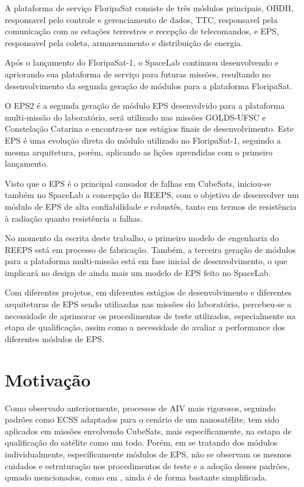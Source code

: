 A plataforma de serviço FloripaSat consiste de três módulos principais, \gls{OBDH}, responsavel pelo controle e gerenciamento de dados, \gls{TTC}, responsavel pela comunicação com as estações terrestres e recepção de telecomandos, e \gls{EPS}, responsavel pela coleta, armazenamento e distribuição de energia.

Após o lançamento do FloripaSat-1, o SpaceLab continuou desenvolvendo e apriorando sua plataforma de serviço para futuras missões, resultando no desenvolvimento da segunda geração de módulos para a plataforma FloripaSat.

O \gls{EPS2} é a segunda geração de módulo \gls{EPS} desenvolvido para a plataforma multi-missão do laboratório, será utilizado nas missões GOLDS-UFSC e Constelação Catarina e encontra-se nos estágios finais de desenvolvimento. Este \gls{EPS} é uma evolução direta do módulo utilizado no FloripaSat-1, seguindo a mesma arquitetura, porém, aplicando as lições aprendidas com o primeiro lançamento.

Visto que o \gls{EPS} é o principal causador de falhas em CubeSats, iniciou-se também no SpaceLab a concepção do \gls{REEPS}, com o objetivo de desenvolver um módulo de \gls{EPS} de alta confiabilidade e robustês, tanto em termos de resistência à radiação quanto resistência a falhas.

No momento da escrita deste trabalho, o primeiro modelo de engenharia do \gls{REEPS} está em processo de fabricação.
Também, a terceira geração de módulos para a plataforma multi-missão está em fase inicial de desenvolvimento, o que implicará no design de ainda mais um modelo de \gls{EPS} feito no SpaceLab.

Com diferentes projetos, em diferentes estágios de desenvolvimento e diferentes arquiteturas de \gls{EPS} sendo utiliazdas nas missões do laboratório, percebeu-se a necessidade de aprimorar os procedimentos de teste utilizados, especialmente na etapa de qualificação, assim como a necessidade de avaliar a performance dos diferentes módulos de \gls{EPS}.

\section{Motivação}\label{sec:intro-motivacao}

Como observado anteriormente, processos de \gls{AIV} mais rigorosos, seguindo padrões como \gls{ECSS} adaptados para o cenário de um nanosatélite, tem sido aplicados em missões envolvendo CubeSats, mais específicamente, na estapa de qualificação do satélite como um todo.
Porém, em se tratando dos módulos individualmente, específicamente módulos de EPS, não se observam os mesmos cuidados e estruturação nos procedimentos de teste e a adoção desses padrões, qunado mencionados, como em \textcite{mist-eps}, ainda é de forma bastante simplificada.

